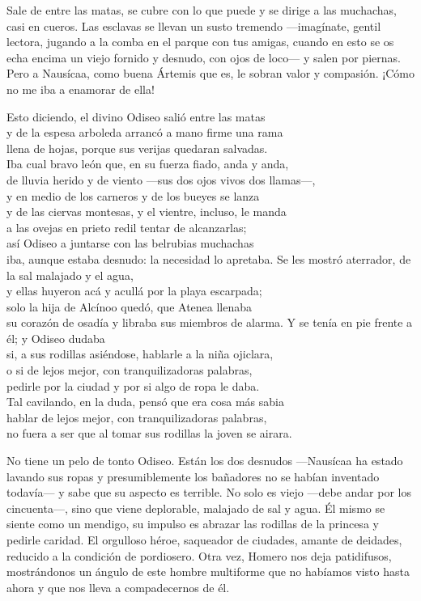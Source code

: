 Sale de entre las matas, se cubre con lo que puede y se dirige a las muchachas, casi en cueros. Las esclavas se llevan un susto tremendo ---imagínate, gentil lectora, jugando a la comba en el parque con tus amigas, cuando en esto se os echa encima un viejo fornido y desnudo, con ojos de loco--- y salen por piernas. Pero a Nausícaa, como buena Ártemis que es, le sobran valor y compasión. ¡Cómo no me iba a enamorar de ella!

\begin{versocita}
Esto diciendo, el divino Odiseo salió entre las matas\\
y de la espesa arboleda arrancó a mano firme una rama\\
llena de hojas, porque sus verijas quedaran salvadas.\\
Iba cual bravo león que, en su fuerza fiado, anda y anda,\\
de lluvia herido y de viento ---sus dos ojos vivos dos llamas---,\\
y en medio de los carneros y de los bueyes se lanza\\
y de las ciervas montesas, y el vientre, incluso, le manda\\
a las ovejas en prieto redil tentar de alcanzarlas;\\
así Odiseo a juntarse con las belrubias muchachas\\
iba, aunque estaba desnudo: la necesidad lo apretaba.
\stanzabreak
Se les mostró aterrador, de la sal malajado y el agua,\\
y ellas huyeron acá y acullá por la playa escarpada;\\
solo la hija de Alcínoo quedó, que Atenea llenaba\\
su corazón de osadía y libraba sus miembros de alarma.
\stanzabreak
Y se tenía en pie frente a él; y Odiseo dudaba\\
si, a sus rodillas asiéndose, hablarle a la niña ojiclara,\\
o si de lejos mejor, con tranquilizadoras palabras,\\
pedirle por la ciudad y por si algo de ropa le daba.\\
Tal cavilando, en la duda, pensó que era cosa más sabia\\
hablar de lejos mejor, con tranquilizadoras palabras,\\
no fuera a ser que al tomar sus rodillas la joven se airara.
\end{versocita}

No tiene un pelo de tonto Odiseo. Están los dos desnudos ---Nausícaa ha estado lavando sus ropas y presumiblemente los bañadores no se habían inventado todavía--- y sabe que su aspecto es terrible. No solo es viejo ---debe andar por los cincuenta---, sino que viene deplorable, malajado de sal y agua. Él mismo se siente como un mendigo, su impulso es abrazar las rodillas de la princesa y pedirle caridad. El orgulloso héroe, saqueador de ciudades, amante de deidades, reducido a la condición de pordiosero. Otra vez, Homero nos deja patidifusos, mostrándonos un ángulo de este hombre multiforme que no habíamos visto hasta ahora y que nos lleva a compadecernos de él.

